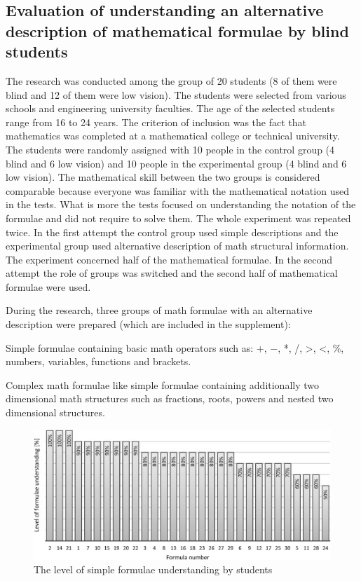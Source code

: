 \documentclass[12pt,1p]{elsarticle}
\begin{document}
\subsection{Evaluation of understanding an alternative description of mathematical formulae by blind students}
	The research was conducted among the group of 20 students (8 of them were blind and 12 of them were low vision). The students were selected from various schools and engineering university faculties. The age of the selected students range from 16 to 24 years. The criterion of inclusion was the fact that mathematics was completed at a mathematical college or technical university. The students were randomly assigned with 10 people in the control group (4 blind and 6 low vision) and 10 people in the experimental group (4 blind and 6 low vision). The mathematical skill between the two groups is considered comparable because everyone was familiar with the mathematical notation used in the tests. What is more the tests focused on understanding the notation of the formulae and did not require to solve them. The whole experiment was repeated twice. In the first attempt the control group used simple descriptions and the experimental group used alternative description of math structural information. The experiment concerned half of the mathematical formulae. In the second attempt the role of groups was switched and the second half of mathematical formulae were used.
	
	During the research, three groups of math formulae with an alternative description were prepared (which are included in the supplement):
	
	Simple formulae containing basic math operators such as: +, −, *, /, \textgreater, \textless, \%, numbers, variables, functions and brackets.
	
	Complex math formulae like simple formulae containing additionally two dimensional math structures such as fractions, roots, powers and nested two dimensional structures.
	
\begin{figure}[t]
\centering
\includegraphics[width=5in]{./pics/6}
\caption{The level of simple formulae understanding by students}
\label{fig06}
\end{figure}	
	
\end{document}
